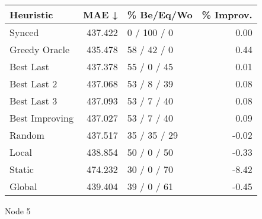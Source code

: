 \begin{tabular}{lrlr}
\toprule
\textbf{Heuristic} & \textbf{MAE ↓} & \textbf{\% Be/Eq/Wo} & \textbf{\% Improv.} \\
\midrule
            Synced &        437.422 &          0 / 100 / 0 &                0.00 \\
     Greedy Oracle &        435.478 &          58 / 42 / 0 &                0.44 \\
         Best Last &        437.378 &          55 / 0 / 45 &                0.01 \\
       Best Last 2 &        437.068 &          53 / 8 / 39 &                0.08 \\
       Best Last 3 &        437.093 &          53 / 7 / 40 &                0.08 \\
    Best Improving &        437.027 &          53 / 7 / 40 &                0.09 \\
            Random &        437.517 &         35 / 35 / 29 &               -0.02 \\
             Local &        438.854 &          50 / 0 / 50 &               -0.33 \\
            Static &        474.232 &          30 / 0 / 70 &               -8.42 \\
            Global &        439.404 &          39 / 0 / 61 &               -0.45 \\
\bottomrule
\end{tabular}
\caption{Node 5}
\label{tab:iid_lr01_le2_bs2_5}
